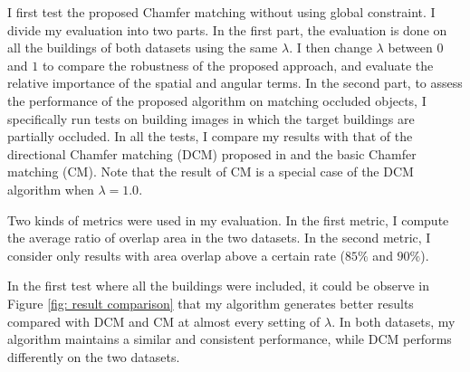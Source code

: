 \documentclass{iitthesis}
\begin{document}
I first test the proposed Chamfer matching without using global constraint. I divide my evaluation into two parts. In the first part, the evaluation is done on all the buildings of both datasets using the same $\lambda$. I then change $\lambda$ between $0$ and $1$ to compare the robustness of the proposed approach, and evaluate the relative importance of the spatial and angular terms. In the second part, to assess the performance of the proposed algorithm on matching occluded objects, I specifically run tests on building images in which the target buildings are partially occluded. In all the tests, I compare my results with that of the directional Chamfer matching (DCM) proposed in \cite{ML:10} and the basic Chamfer matching (CM). Note that the result of CM is a special case of the DCM algorithm when $\lambda=1.0$.

Two kinds of metrics were used in my evaluation. In the first metric, I compute the average ratio of overlap area in the two datasets. In the second metric, I consider only results with area overlap above a certain rate ($85\%$ and $90\%$). 

In the first test where all the buildings were included, it could be observe in Figure \ref{fig: result comparison} that my algorithm generates better results compared with DCM and CM at almost every setting of $\lambda$. In both datasets, my algorithm maintains a similar and consistent performance, while DCM performs differently on the two datasets.
\end{document}
